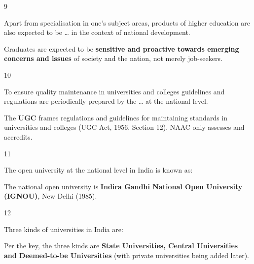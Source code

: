 \begin{question}{9}
{Apart from specialisation in one's subject areas, products of higher education are also expected to be \ldots{} in the context of national development.\par}
\begin{explain}
Graduates are expected to be \textbf{sensitive and proactive towards emerging concerns and issues} of society and the nation, not merely job-seekers.
\end{explain}
\end{question}

\begin{question}{10}
{To ensure quality maintenance in universities and colleges guidelines and regulations are periodically prepared by the \ldots{} at the national level.\par}
\begin{explain}
The \textbf{UGC} frames regulations and guidelines for maintaining standards in universities and colleges (UGC Act, 1956, Section 12). NAAC only assesses and accredits.
\end{explain}
\end{question}

\begin{question}{11}
{The open university at the national level in India is known as:\par}
\begin{explain}
The national open university is \textbf{Indira Gandhi National Open University (IGNOU)}, New Delhi (1985).
\end{explain}
\end{question}

\begin{question}{12}
{Three kinds of universities in India are:\par}
\begin{explain}
Per the key, the three kinds are \textbf{State Universities, Central Universities and Deemed-to-be Universities} (with private universities being added later).
\end{explain}
\end{question}

